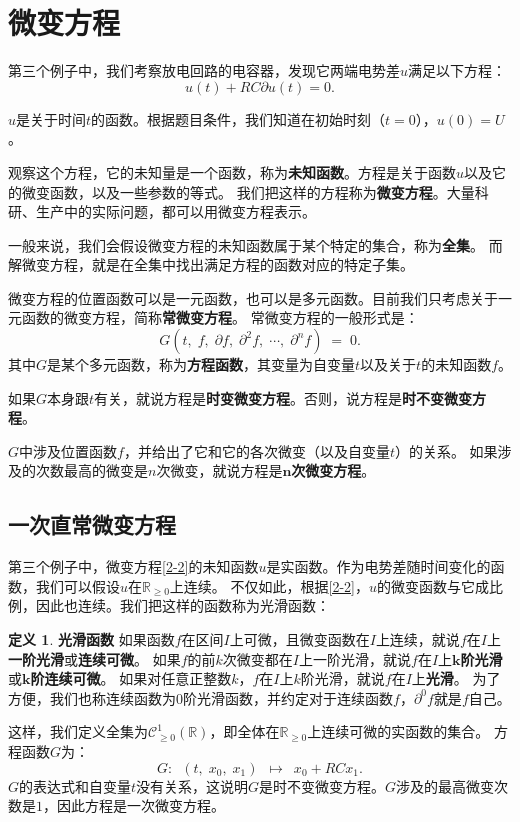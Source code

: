 \documentclass[12pt,UTF8]{ctexbook}
\theoremstyle{definition}
\newtheorem{df}{定义}[section]
\theoremstyle{plain}
\begin{document}
\section{微变方程}

第三个例子中，我们考察放电回路的电容器，发现它两端电势差$u$满足以下方程：
\begin{equation}
    u(t) + RC\partial  u(t) = 0. \label{2-2}
\end{equation}

$u$是关于时间$t$的函数。根据题目条件，我们知道在初始时刻（$t=0$），$u(0) = U$。

观察这个方程，它的未知量是一个函数，称为\textbf{未知函数}。方程是关于函数$u$以及它的微变函数，以及一些参数的等式。
我们把这样的方程称为\textbf{微变方程}。大量科研、生产中的实际问题，都可以用微变方程表示。

一般来说，我们会假设微变方程的未知函数属于某个特定的集合，称为\textbf{全集}。
而解微变方程，就是在全集中找出满足方程的函数对应的特定子集。

微变方程的位置函数可以是一元函数，也可以是多元函数。目前我们只考虑关于一元函数的微变方程，简称\textbf{常微变方程}。
常微变方程的一般形式是：
$$ G(t, \; f, \; \partial f, \; \partial^2 f, \; \cdots , \; \partial^n f)\;  =\;  0.$$
其中$G$是某个多元函数，称为\textbf{方程函数}，其变量为自变量$t$以及关于$t$的未知函数$f$。

如果$G$本身跟$t$有关，就说方程是\textbf{时变微变方程}。否则，说方程是\textbf{时不变微变方程}。

$G$中涉及位置函数$f$，并给出了它和它的各次微变（以及自变量$t$）的关系。
如果涉及的次数最高的微变是$n$次微变，就说方程是$\boldsymbol{n}$\textbf{次微变方程}。

\subsection{一次直常微变方程}
第三个例子中，微变方程\eqref{2-2}的未知函数$u$是实函数。作为电势差随时间变化的函数，我们可以假设$u$在$\mathbb{R}_{\geqslant 0}$上连续。
不仅如此，根据\eqref{2-2}，$u$的微变函数与它成比例，因此也连续。我们把这样的函数称为光滑函数：
\begin{df}{\textbf{光滑函数}}
    如果函数$f$在区间$I$上可微，且微变函数在$I$上连续，就说$f$在$I$上\textbf{一阶光滑}或\textbf{连续可微}。
    如果$f$的前$k$次微变都在$I$上一阶光滑，就说$f$在$I$上$\boldsymbol{k}$\textbf{阶光滑}或$\boldsymbol{k}$\textbf{阶连续可微}。
    如果对任意正整数$k$，$f$在$I$上$k$阶光滑，就说$f$在$I$上\textbf{光滑}。
    为了方便，我们也称连续函数为$0$阶光滑函数，并约定对于连续函数$f$，$\partial^0 f$就是$f$自己。
\end{df}
这样，我们定义全集为$\mathcal{C}^1_{\geqslant 0}(\mathbb{R})$，即全体在$\mathbb{R}_{\geqslant 0}$上连续可微的实函数的集合。
方程函数$G$为：
$$ G: \,\,\,(t, \; x_0, \; x_1) \,\,\, \mapsto \,\,\, x_0 + RC x_1. $$
$G$的表达式和自变量$t$没有关系，这说明$G$是时不变微变方程。$G$涉及的最高微变次数是$1$，因此方程是一次微变方程。
\end{document}
